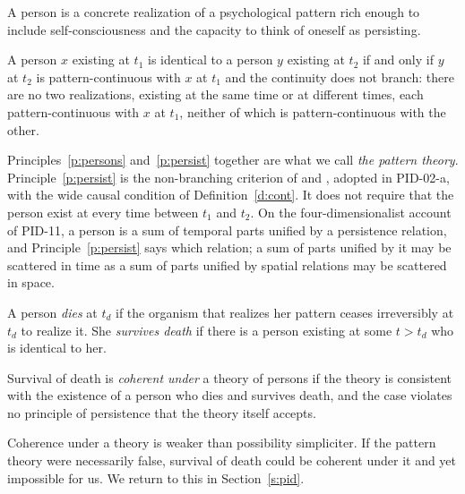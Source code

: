 \documentclass{situationist-preprint}
\begin{document}
\begin{principle}[Persons]\label{p:persons}
A person is a concrete realization of a psychological pattern rich enough to include self-consciousness and the capacity to think of oneself as persisting.
\end{principle}

\begin{principle}[Persistence]\label{p:persist}
A person $x$ existing at $t_1$ is identical to a person $y$ existing at $t_2$ if and only if $y$ at $t_2$ is pattern-continuous with $x$ at $t_1$ and the continuity does not branch: there are no two realizations, existing at the same time or at different times, each pattern-continuous with $x$ at $t_1$, neither of which is pattern-continuous with the other.
\end{principle}

Principles~\ref{p:persons} and~\ref{p:persist} together are what we call \emph{the pattern theory}. Principle~\ref{p:persist} is the non-branching criterion of \citet{Shoemaker1984} and \citet{Parfit1984}, adopted in PID-02-a, with the wide causal condition of Definition~\ref{d:cont}. It does not require that the person exist at every time between $t_1$ and $t_2$. On the four-dimensionalist account of PID-11, a person is a sum of temporal parts unified by a persistence relation, and Principle~\ref{p:persist} says which relation; a sum of parts unified by it may be scattered in time as a sum of parts unified by spatial relations may be scattered in space.

\begin{definition}\label{d:death}
A person \emph{dies} at $t_d$ if the organism that realizes her pattern ceases irreversibly at $t_d$ to realize it. She \emph{survives death} if there is a person existing at some $t > t_d$ who is identical to her.
\end{definition}

\begin{definition}[Coherence]\label{d:coh}
Survival of death is \emph{coherent under} a theory of persons if the theory is consistent with the existence of a person who dies and survives death, and the case violates no principle of persistence that the theory itself accepts.
\end{definition}

Coherence under a theory is weaker than possibility simpliciter. If the pattern theory were necessarily false, survival of death could be coherent under it and yet impossible for us. We return to this in Section~\ref{s:pid}.
\end{document}
